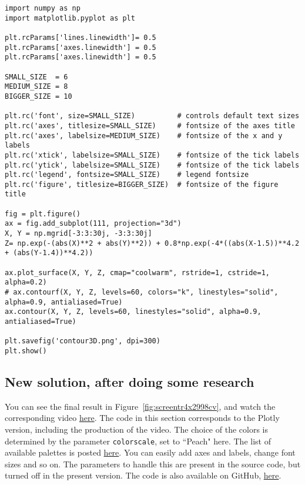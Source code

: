 \documentclass[oneside,10pt]{book}
\begin{document}
\begin{lstlisting}
import numpy as np
import matplotlib.pyplot as plt

plt.rcParams['lines.linewidth']= 0.5
plt.rcParams['axes.linewidth'] = 0.5
plt.rcParams['axes.linewidth'] = 0.5
 
SMALL_SIZE  = 6
MEDIUM_SIZE = 8
BIGGER_SIZE = 10

plt.rc('font', size=SMALL_SIZE)          # controls default text sizes
plt.rc('axes', titlesize=SMALL_SIZE)     # fontsize of the axes title
plt.rc('axes', labelsize=MEDIUM_SIZE)    # fontsize of the x and y labels
plt.rc('xtick', labelsize=SMALL_SIZE)    # fontsize of the tick labels
plt.rc('ytick', labelsize=SMALL_SIZE)    # fontsize of the tick labels
plt.rc('legend', fontsize=SMALL_SIZE)    # legend fontsize
plt.rc('figure', titlesize=BIGGER_SIZE)  # fontsize of the figure title

fig = plt.figure()
ax = fig.add_subplot(111, projection="3d")
X, Y = np.mgrid[-3:3:30j, -3:3:30j]
Z= np.exp(-(abs(X)**2 + abs(Y)**2)) + 0.8*np.exp(-4*((abs(X-1.5))**4.2 + (abs(Y-1.4))**4.2))

ax.plot_surface(X, Y, Z, cmap="coolwarm", rstride=1, cstride=1, alpha=0.2)
# ax.contourf(X, Y, Z, levels=60, colors="k", linestyles="solid", alpha=0.9, antialiased=True) 
ax.contour(X, Y, Z, levels=60, linestyles="solid", alpha=0.9, antialiased=True) 

plt.savefig('contour3D.png', dpi=300)
plt.show()
\end{lstlisting}

\subsection{New solution, after doing some research}\label{porousbutane}

\noindent You can see the final result in Figure~\ref{fig:screentr4x2998cv}, and watch the corresponding 
video \href{https://www.youtube.com/watch?v=Jpjw8wtoZrM}{here}. 
The code in this section corresponds to the Plotly version, including the production of the video. The choice of the colors is determined by the parameter \texttt{colorscale}, set to ``Peach" here. The list of available palettes is posted \href{https://plotly.com/python/builtin-colorscales/}{here}. You can easily add axes and labels, change font sizes and so on. The parameters to handle this are present in the source code, but turned off in the present version. The code is also available on GitHub, \href{https://github.com/VincentGranville/Visualizations/blob/main/Source-Code/contourvideoplotly.py}{here}.
\end{document}
